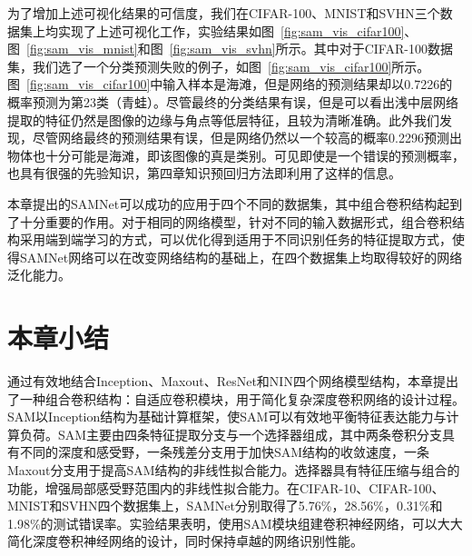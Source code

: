 为了增加上述可视化结果的可信度，我们在CIFAR-100、MNIST和SVHN三个数据集上均实现了上述可视化工作，实验结果如图~\ref{fig:sam_vis_cifar100}、图~\ref{fig:sam_vis_mnist}和图~\ref{fig:sam_vis_svhn}所示。其中对于CIFAR-100数据集，我们选了一个分类预测失败的例子，如图~\ref{fig:sam_vis_cifar100}所示。图~\ref{fig:sam_vis_cifar100}中输入样本是海滩，但是网络的预测结果却以0.7226的概率预测为第23类（青蛙）。尽管最终的分类结果有误，但是可以看出浅中层网络提取的特征仍然是图像的边缘与角点等低层特征，且较为清晰准确。此外我们发现，尽管网络最终的预测结果有误，但是网络仍然以一个较高的概率0.2296预测出物体也十分可能是海滩，即该图像的真是类别。可见即使是一个错误的预测概率，也具有很强的先验知识，第四章知识预回归方法即利用了这样的信息。


本章提出的SAMNet可以成功的应用于四个不同的数据集，其中组合卷积结构起到了十分重要的作用。对于相同的网络模型，针对不同的输入数据形式，组合卷积结构采用端到端学习的方式，可以优化得到适用于不同识别任务的特征提取方式，使得SAMNet网络可以在改变网络结构的基础上，在四个数据集上均取得较好的网络泛化能力。


\section{本章小结}
\label{sec:sap:conclusion}

通过有效地结合Inception、Maxout、ResNet和NIN四个网络模型结构，本章提出了一种组合卷积结构：自适应卷积模块，用于简化复杂深度卷积网络的设计过程。SAM以Inception结构为基础计算框架，使SAM可以有效地平衡特征表达能力与计算负荷。SAM主要由四条特征提取分支与一个选择器组成，其中两条卷积分支具有不同的深度和感受野，一条残差分支用于加快SAM结构的收敛速度，一条Maxout分支用于提高SAM结构的非线性拟合能力。选择器具有特征压缩与组合的功能，增强局部感受野范围内的非线性拟合能力。在CIFAR-10、CIFAR-100、MNIST和SVHN四个数据集上，SAMNet分别取得了5.76\%，28.56\%，0.31\%和1.98\%的测试错误率。实验结果表明，使用SAM模块组建卷积神经网络，可以大大简化深度卷积神经网络的设计，同时保持卓越的网络识别性能。